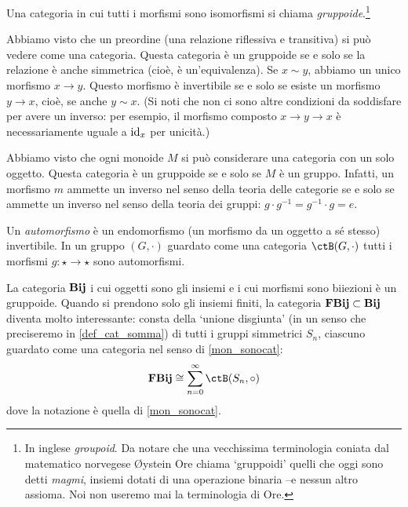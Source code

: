 \begin{definition}[Gruppoide]\label{def_gruppoide}
	Una categoria in cui tutti i morfismi sono isomorfismi si chiama \emph{gruppoide}.\footnote{In inglese \emph{groupoid}. Da notare che una vecchissima terminologia coniata dal matematico norvegese Øystein Ore chiama `gruppoidi' quelli che oggi sono detti \emph{magmi}, insiemi dotati di una operazione binaria --e nessun altro assioma. Noi non useremo mai la terminologia di Ore.}
\end{definition}
\begin{example}\label{exa_releq_groupoid}
	Abbiamo visto che un preordine (una relazione riflessiva e transitiva) si può vedere come una categoria. Questa categoria è un gruppoide se e solo se la relazione è anche simmetrica (cioè, è un'equivalenza). Se \(x\sim y\), abbiamo un unico morfismo \(x\to y\). Questo morfismo è invertibile se e solo se esiste un morfismo \(y\to x\), cioè, se anche \(y\sim x\). (Si noti che non ci sono altre condizioni da soddisfare per avere un inverso: per esempio, il morfismo composto \(x\to y\to x\) è necessariamente uguale a \(\mathrm{id}_x\) per unicità.)
\end{example}
\begin{example}\label{exa_grp_groupoid}
	Abbiamo visto che ogni monoide \(M\) si può considerare una categoria con un solo oggetto. Questa categoria è un gruppoide se e solo se \(M\) è un gruppo. Infatti, un morfismo \(m\) ammette un inverso nel senso della teoria delle categorie se e solo se ammette un inverso nel senso della teoria dei gruppi: \(g\cdot g^{-1}=g^{-1}\cdot g = e\).
\end{example}

Un \emph{automorfismo} è un endomorfismo (un morfismo da un oggetto a sé stesso) invertibile. In un gruppo \((G,\cdot)\) guardato come una categoria \(\ctB(G,\cdot)\) tutti i morfismi \(g : \star\to\star\) sono automorfismi.

\begin{example}
	La categoria \(\mathbf{Bij}\) i cui oggetti sono gli insiemi e i cui morfismi sono biiezioni è un gruppoide. Quando si prendono solo gli insiemi finiti, la categoria \(\mathbf{FBij}\subset\mathbf{Bij}\) diventa molto interessante: consta della `unione disgiunta' (in un senso che preciseremo in \ref{def_cat_somma}) di tutti i gruppi simmetrici \(S_n\), ciascuno guardato come una categoria nel senso di \ref{mon_sonocat}:
	\[\cate{FBij}\cong \sum_{n=0}^\infty \ctB(S_n,\circ)\]
	dove la notazione è quella di \ref{mon_sonocat}.
\end{example}

